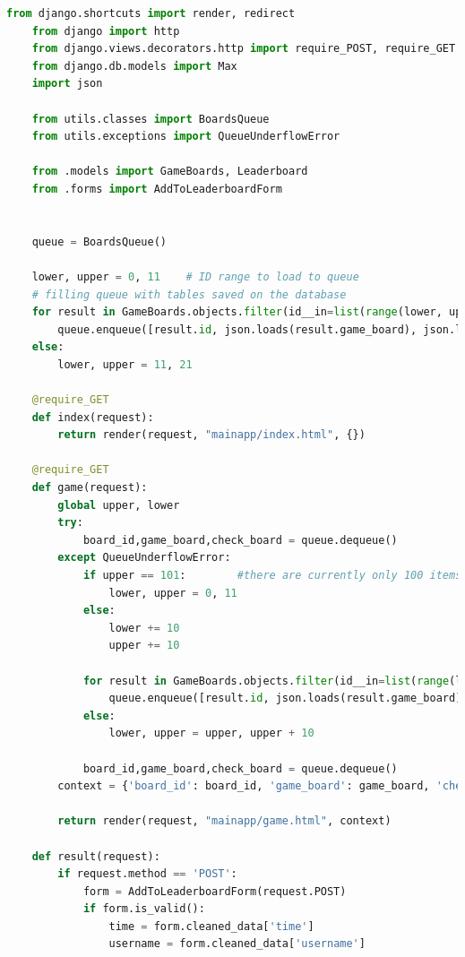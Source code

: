 \documentclass[12pt, a4paper]{report}
\begin{document}
    \begin{lstlisting}[language=Python, caption=mainapp/views.py]
    from django.shortcuts import render, redirect
    from django import http
    from django.views.decorators.http import require_POST, require_GET
    from django.db.models import Max
    import json
    
    from utils.classes import BoardsQueue
    from utils.exceptions import QueueUnderflowError
    
    from .models import GameBoards, Leaderboard
    from .forms import AddToLeaderboardForm
    
    
    queue = BoardsQueue()
    
    lower, upper = 0, 11    # ID range to load to queue
    # filling queue with tables saved on the database
    for result in GameBoards.objects.filter(id__in=list(range(lower, upper))):
        queue.enqueue([result.id, json.loads(result.game_board), json.loads(result.check_board)])
    else:
        lower, upper = 11, 21
    
    @require_GET
    def index(request):
        return render(request, "mainapp/index.html", {})
    
    @require_GET
    def game(request):
        global upper, lower
        try:
            board_id,game_board,check_board = queue.dequeue()
        except QueueUnderflowError:
            if upper == 101:        #there are currently only 100 items on the database, so it loops back to the starting.
                lower, upper = 0, 11
            else:
                lower += 10
                upper += 10
    
            for result in GameBoards.objects.filter(id__in=list(range(lower, upper))):  #loading new tables from database
                queue.enqueue([result.id, json.loads(result.game_board), json.loads(result.check_board)])
            else:
                lower, upper = upper, upper + 10
    
            board_id,game_board,check_board = queue.dequeue()
        context = {'board_id': board_id, 'game_board': game_board, 'check_board': check_board, 'form': AddToLeaderboardForm()}
        
        return render(request, "mainapp/game.html", context)
    
    def result(request):
        if request.method == 'POST':
            form = AddToLeaderboardForm(request.POST)
            if form.is_valid():
                time = form.cleaned_data['time']
                username = form.cleaned_data['username']
    

\end{lstlisting}
\end{document}
